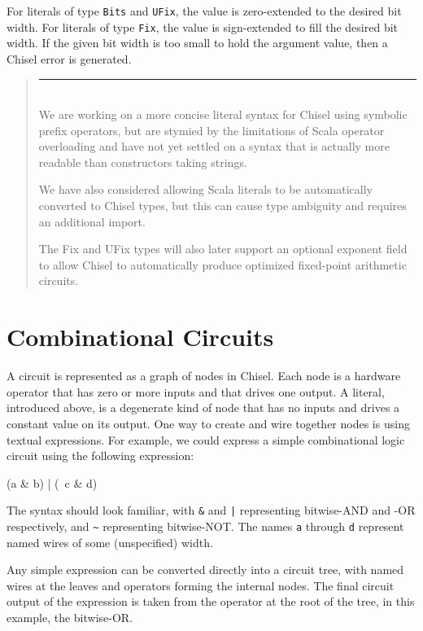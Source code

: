 \documentclass[10pt]{article}
\newenvironment{commentary}
{ \vspace{-0.1in}
  \begin{quotation}
  \noindent
  \small \em
  \rule{\linewidth}{1pt}\\
}
{
  \end{quotation}
}
\def\code#1{{\tt #1}}
\begin{document}
\noindent
For literals of type \code{Bits} and \code{UFix}, the value is
zero-extended to the desired bit width.  For literals of type
\code{Fix}, the value is sign-extended to fill the desired bit width.
If the given bit width is too small to hold the argument value, then a
Chisel error is generated.

\begin{commentary}
We are working on a more concise literal syntax for Chisel using
symbolic prefix operators, but are stymied by the limitations of Scala
operator overloading and have not yet settled on a syntax that is
actually more readable than constructors taking strings.

We have also considered allowing Scala literals to be automatically
converted to Chisel types, but this can cause type ambiguity and
requires an additional import.

The Fix and UFix types will also later support an optional exponent
field to allow Chisel to automatically produce optimized fixed-point
arithmetic circuits.
\end{commentary}

\section{Combinational Circuits}

A circuit is represented as a graph of nodes in Chisel.  Each node is
a hardware operator that has zero or more inputs and that drives one
output.  A literal, introduced above, is a degenerate kind of node
that has no inputs and drives a constant value on its output.  One way
to create and wire together nodes is using textual expressions.  For
example, we could express a simple combinational logic circuit
using the following expression:

\begin{scala}
(a & b) | (~c & d)
\end{scala}

The syntax should look familiar, with \code{\&} and \code{|}
representing bitwise-AND and -OR respectively, and \code{\~{}}
representing bitwise-NOT.  The names \code{a} through \code{d}
represent named wires of some (unspecified) width.

Any simple expression can be converted directly into a circuit tree,
with named wires at the leaves and operators forming the internal
nodes.  The final circuit output of the expression is taken from the
operator at the root of the tree, in this example, the bitwise-OR.
\end{document}
